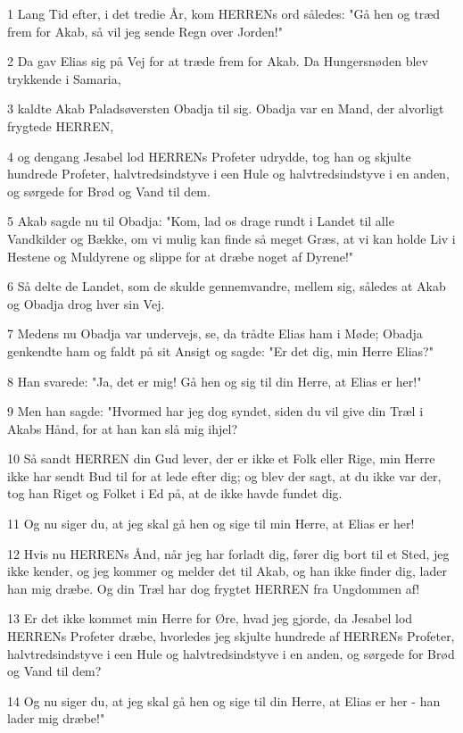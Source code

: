 \par 1 Lang Tid efter, i det tredie År, kom HERRENs ord således: "Gå hen og træd frem for Akab, så vil jeg sende Regn over Jorden!"
\par 2 Da gav Elias sig på Vej for at træde frem for Akab. Da Hungersnøden blev trykkende i Samaria,
\par 3 kaldte Akab Paladsøversten Obadja til sig. Obadja var en Mand, der alvorligt frygtede HERREN,
\par 4 og dengang Jesabel lod HERRENs Profeter udrydde, tog han og skjulte hundrede Profeter, halvtredsindstyve i een Hule og halvtredsindstyve i en anden, og sørgede for Brød og Vand til dem.
\par 5 Akab sagde nu til Obadja: "Kom, lad os drage rundt i Landet til alle Vandkilder og Bække, om vi mulig kan finde så meget Græs, at vi kan holde Liv i Hestene og Muldyrene og slippe for at dræbe noget af Dyrene!"
\par 6 Så delte de Landet, som de skulde gennemvandre, mellem sig, således at Akab og Obadja drog hver sin Vej.
\par 7 Medens nu Obadja var undervejs, se, da trådte Elias ham i Møde; Obadja genkendte ham og faldt på sit Ansigt og sagde: "Er det dig, min Herre Elias?"
\par 8 Han svarede: "Ja, det er mig! Gå hen og sig til din Herre, at Elias er her!"
\par 9 Men han sagde: "Hvormed har jeg dog syndet, siden du vil give din Træl i Akabs Hånd, for at han kan slå mig ihjel?
\par 10 Så sandt HERREN din Gud lever, der er ikke et Folk eller Rige, min Herre ikke har sendt Bud til for at lede efter dig; og blev der sagt, at du ikke var der, tog han Riget og Folket i Ed på, at de ikke havde fundet dig.
\par 11 Og nu siger du, at jeg skal gå hen og sige til min Herre, at Elias er her!
\par 12 Hvis nu HERRENs Ånd, når jeg har forladt dig, fører dig bort til et Sted, jeg ikke kender, og jeg kommer og melder det til Akab, og han ikke finder dig, lader han mig dræbe. Og din Træl har dog frygtet HERREN fra Ungdommen af!
\par 13 Er det ikke kommet min Herre for Øre, hvad jeg gjorde, da Jesabel lod HERRENs Profeter dræbe, hvorledes jeg skjulte hundrede af HERRENs Profeter, halvtredsindstyve i een Hule og halvtredsindstyve i en anden, og sørgede for Brød og Vand til dem?
\par 14 Og nu siger du, at jeg skal gå hen og sige til din Herre, at Elias er her - han lader mig dræbe!"

